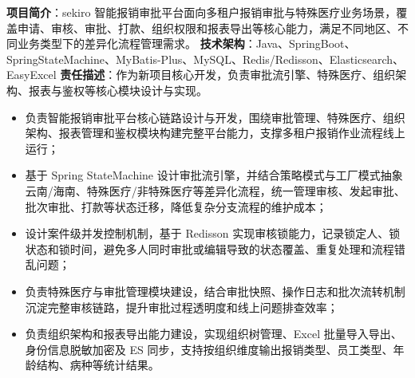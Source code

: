 \documentclass[11pt]{resume}
\begin{document}
\newline \textbf{项目简介}：sekiro 智能报销审批平台面向多租户报销审批与特殊医疗业务场景，覆盖申请、审核、审批、打款、组织权限和报表导出等核心能力，满足不同地区、不同业务类型下的差异化流程管理需求。
\newline \textbf{技术架构}：Java、SpringBoot、SpringStateMachine、MyBatis-Plus、MySQL、Redis/Redisson、Elasticsearch、EasyExcel
\newline \textbf{责任描述}：作为新项目核心开发，负责审批流引擎、特殊医疗、组织架构、报表与鉴权等核心模块设计与实现。
\begin{itemize}
    \item 负责智能报销审批平台核心链路设计与开发，围绕审批管理、特殊医疗、组织架构、报表管理和鉴权模块构建完整平台能力，支撑多租户报销作业流程线上运行；
    \item 基于 Spring StateMachine 设计审批流引擎，并结合策略模式与工厂模式抽象云南/海南、特殊医疗/非特殊医疗等差异化流程，统一管理审核、发起审批、批次审批、打款等状态迁移，降低复杂分支流程的维护成本；
    \item 设计案件级并发控制机制，基于 Redisson 实现审核锁能力，记录锁定人、锁状态和锁时间，避免多人同时审批或编辑导致的状态覆盖、重复处理和流程错乱问题；
    \item 负责特殊医疗与审批管理模块建设，结合审批快照、操作日志和批次流转机制沉淀完整审核链路，提升审批过程透明度和线上问题排查效率；
    \item 负责组织架构和报表导出能力建设，实现组织树管理、Excel 批量导入导出、身份信息脱敏加密及 ES 同步，支持按组织维度输出报销类型、员工类型、年龄结构、病种等统计结果。
\end{itemize}
\end{document}
